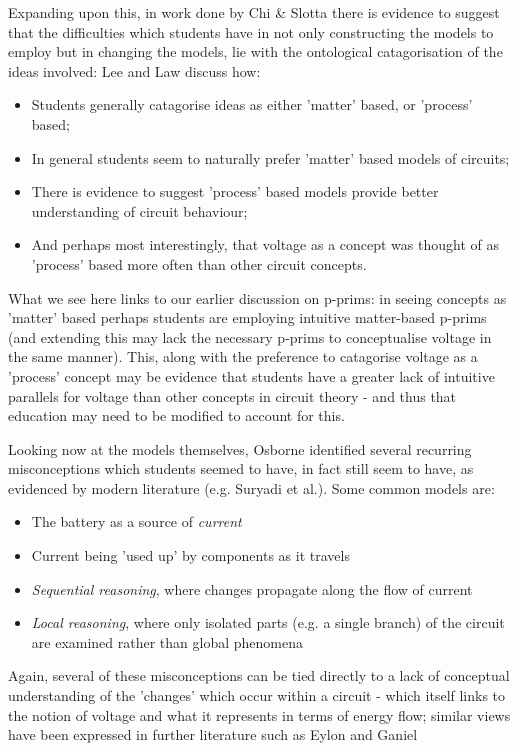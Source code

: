 \documentclass[a4paper,openany,nobib]{tufte-book}
\begin{document}
Expanding upon this, in work done by Chi \& Slotta\autocite{slotta} there is evidence to suggest that the difficulties which students have in not only constructing the models to employ but in changing the models, lie with the ontological catagorisation of the ideas involved: Lee and Law\autocite{lee2001} discuss how:
\begin{itemize}
	\item Students generally catagorise ideas as either 'matter' based, or 'process' based;
	\item In general students seem to naturally prefer 'matter' based models of circuits;
	\item There is evidence to suggest 'process' based models provide better understanding of circuit behaviour;
	\item And perhaps most interestingly, that voltage as a concept was thought of as 'process' based more often than other circuit concepts.
\end{itemize}
What we see here links to our earlier discussion on p-prims:
in seeing concepts as 'matter' based perhaps students are employing intuitive matter-based p-prims (and extending this may lack the necessary p-prims to conceptualise voltage in the same manner). This, along with the preference to catagorise voltage as a 'process' concept may be evidence that students have a greater lack of intuitive parallels for voltage than other concepts in circuit theory - and thus that education may need to be modified to account for this. 

Looking now at the models themselves, Osborne\autocite{osb} identified several recurring misconceptions which students seemed to have, in fact still seem to have, as evidenced by modern literature (e.g. Suryadi et al.\autocite{suryadi2020}). 
Some common models are:
\begin{itemize}
	\item The battery as a source of \emph{current} 
	\item Current being 'used up' by components as it travels
	\item \emph{Sequential reasoning}, where changes propagate along the flow of current
	\item \emph{Local reasoning}, where only isolated parts (e.g. a single branch) of the circuit are examined rather than global phenomena
\end{itemize}
Again, several of these misconceptions can be tied directly to a lack of conceptual understanding of the 'changes' which occur within a circuit - which itself links to the notion of voltage and what it represents in terms of energy flow; similar views have been expressed in further literature such as Eylon and Ganiel\autocite{eylon1990}
\end{document}

